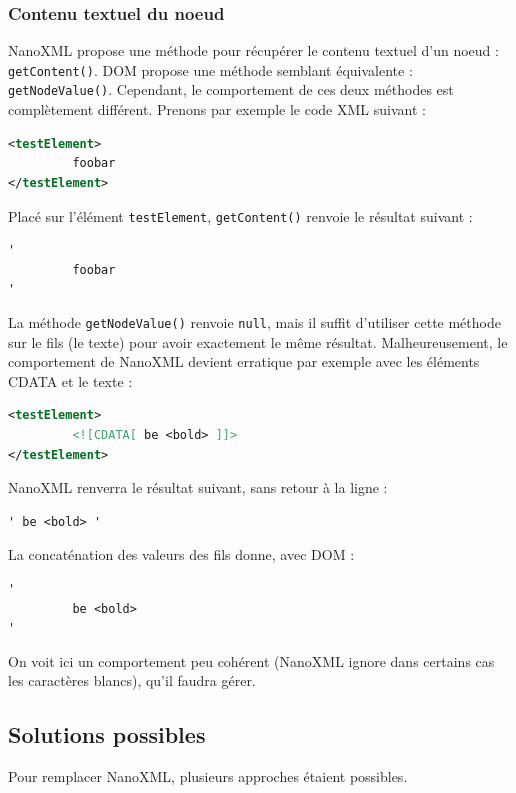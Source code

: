 \subsubsection{Contenu textuel du noeud}
NanoXML propose une méthode pour récupérer le contenu textuel d'un noeud : \verb|getContent()|.
DOM propose une méthode semblant équivalente : \verb|getNodeValue()|.
Cependant, le comportement de ces deux méthodes est complètement différent.
Prenons par exemple le code XML suivant :
\begin{lstlisting}[language=XML]
<testElement>
         foobar
</testElement>
\end{lstlisting}
Placé sur l'élément \verb|testElement|, \verb|getContent()| renvoie le résultat suivant :
\begin{verbatim}
'
         foobar
'
\end{verbatim}
La méthode \verb|getNodeValue()| renvoie \verb|null|, mais il suffit d'utiliser cette méthode sur le fils (le texte) pour avoir exactement le même résultat.
Malheureusement, le comportement de NanoXML devient erratique par exemple avec les éléments CDATA et le texte :
\begin{lstlisting}[language=XML]
<testElement>
         <![CDATA[ be <bold> ]]>
</testElement>
\end{lstlisting}
NanoXML renverra le résultat suivant, sans retour à la ligne :
\begin{verbatim}
' be <bold> '
\end{verbatim}
La concaténation des valeurs des fils donne, avec DOM :
\begin{verbatim}
'
         be <bold>
'
\end{verbatim}
On voit ici un comportement peu cohérent (NanoXML ignore dans certains cas les caractères blancs), qu'il faudra gérer.

\subsection{Solutions possibles}
Pour remplacer NanoXML, plusieurs approches étaient possibles.

